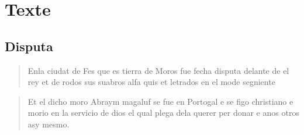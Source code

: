 \section{Texte}

\subsection{Disputa }

\begin{quote}
    Enla ciudat de Fes que es tierra de Moros fue fecha disputa delante de el rey et de rodos sus suabros alfa quis et letrados en el mode segniente  
\end{quote}

\begin{quote}
Et el dicho moro Abraym magaluf se fue en Portogal e se figo christiano e morio en la servicio de dios el qual plega dela querer per donar e anos otros asy mesmo.
\end{quote}